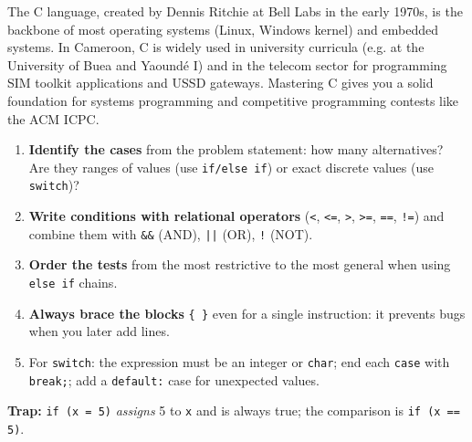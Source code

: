 \documentclass[11pt]{article}
\begin{document}
\begin{savaistu}[C in Cameroon]
The C language, created by Dennis Ritchie at Bell Labs in the early 1970s, is the backbone of most operating systems (Linux, Windows kernel) and embedded systems. In Cameroon, C is widely used in university curricula (e.g. at the University of Buea and Yaoundé I) and in the telecom sector for programming SIM toolkit applications and USSD gateways. Mastering C gives you a solid foundation for systems programming and competitive programming contests like the ACM ICPC.
\end{savaistu}

\begin{methode}
\begin{enumerate}
\item \textbf{Identify the cases} from the problem statement: how many alternatives? Are they ranges of values (use \texttt{if/else if}) or exact discrete values (use \texttt{switch})?
\item \textbf{Write conditions with relational operators} (\texttt{<}, \texttt{<=}, \texttt{>}, \texttt{>=}, \texttt{==}, \texttt{!=}) and combine them with \texttt{\&\&} (AND), \texttt{||} (OR), \texttt{!} (NOT).
\item \textbf{Order the tests} from the most restrictive to the most general when using \texttt{else if} chains.
\item \textbf{Always brace the blocks} \texttt{\{ \}} even for a single instruction: it prevents bugs when you later add lines.
\item For \texttt{switch}: the expression must be an integer or \texttt{char}; end each \texttt{case} with \texttt{break;}; add a \texttt{default:} case for unexpected values.
\end{enumerate}
\textbf{Trap:} \texttt{if (x = 5)} \emph{assigns} 5 to \texttt{x} and is always true; the comparison is \texttt{if (x == 5)}.
\end{methode}
\end{document}
